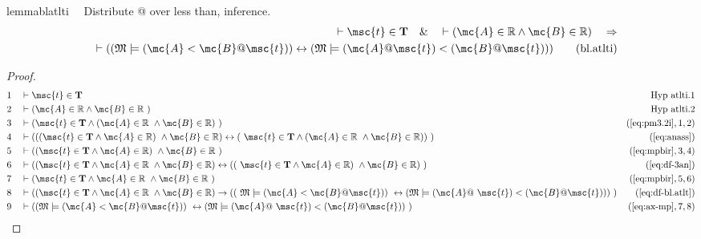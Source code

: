 \begin{restatable}{lemma}{blatlti}~~ Distribute @ over less than, inference.
\begin{align}
\vdash \msc{t} \in \mathbf{T}\quad\&\quad \vdash ( \mc{A} \in \mathbb{R} \wedge
    \mc{B} \in \mathbb{R} )\quad\Rightarrow \notag \\ 
	\quad \vdash ( ( \mathfrak{M}
    \models ( \mc{A} < \mc{B} @ \msc{t} ) ) \leftrightarrow ( \mathfrak{M}
    \models ( \mc{A} @ \msc{t} ) < ( \mc{B} @ \msc{t} ) )
    )\label{eq:bl.atlti}\tag{bl.atlti}
\end{align}
\end{restatable}

\begin{proof}
\begin{align}
  1 &&  & \vdash \msc{t} \in \mathbf{T}&\text{Hyp~atlti.1}\notag%
  \\ 2 &&  & \vdash ( \mc{A} \in \mathbb{R} \wedge \mc{B} \in \mathbb{R}
     ~)&\text{Hyp~atlti.2}\notag%
  \\ 3 &&  & \vdash ( \msc{t} \in \mathbf{T} \wedge ( \mc{A} \in \mathbb{R}
     ~\wedge \mc{B} \in \mathbb{R} )
     ~)&(\mbox{\ref{eq:pm3.2i}},1,2)\notag
  \\ 4 &&  & \vdash ( ( ( \msc{t} \in \mathbf{T} \wedge \mc{A} \in \mathbb{R} )
     ~\wedge \mc{B} \in \mathbb{R} ) \leftrightarrow (
     ~\msc{t} \in \mathbf{T} \wedge ( \mc{A} \in \mathbb{R}
     ~\wedge \mc{B} \in \mathbb{R} ) )
     ~)&(\mbox{\ref{eq:anass}})\notag
  \\ 5 &&  & \vdash ( ( \msc{t} \in \mathbf{T} \wedge \mc{A} \in \mathbb{R} )
     ~\wedge \mc{B} \in \mathbb{R}
     ~)&(\mbox{\ref{eq:mpbir}},3,4)\notag
  \\ 6 &&  & \vdash ( ( \msc{t} \in \mathbf{T} \wedge \mc{A} \in \mathbb{R}
     ~\wedge \mc{B} \in \mathbb{R} ) \leftrightarrow ( (
     ~\msc{t} \in \mathbf{T} \wedge \mc{A} \in \mathbb{R} )
     ~\wedge \mc{B} \in \mathbb{R} )
     ~)&(\mbox{\ref{eq:df-3an}})\notag
  \\ 7 &&  & \vdash ( \msc{t} \in \mathbf{T} \wedge \mc{A} \in \mathbb{R}
     ~\wedge \mc{B} \in \mathbb{R}
     ~)&(\mbox{\ref{eq:mpbir}},5,6)\notag
  \\ 8 &&  & \vdash ( ( \msc{t} \in \mathbf{T} \wedge \mc{A} \in \mathbb{R}
     ~\wedge \mc{B} \in \mathbb{R} ) \rightarrow ( (
     ~\mathfrak{M} \models ( \mc{A} < \mc{B} @ \msc{t} ) )
     ~\leftrightarrow ( \mathfrak{M} \models ( \mc{A} @
     ~\msc{t} ) < ( \mc{B} @ \msc{t} ) ) )
     ~)&(\mbox{\ref{eq:df-bl.atlt}})\notag
  \\ 9 &&  & \vdash ( ( \mathfrak{M} \models ( \mc{A} < \mc{B} @ \msc{t} ) )
     ~\leftrightarrow ( \mathfrak{M} \models ( \mc{A} @
     ~\msc{t} ) < ( \mc{B} @ \msc{t} ) )
     ~)&(\mbox{\ref{eq:ax-mp}},7,8)\notag
\end{align}
\end{proof}

